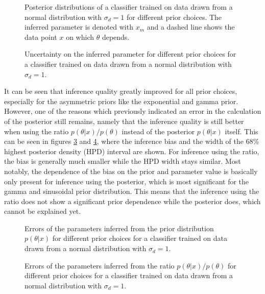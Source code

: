 \documentclass{article}
\begin{document}
\begin{figure}[ht]
    \centering
    
    \caption{Posterior distributions of a classifier trained on data drawn from a normal distribution with $\sigma_d=1$ for different prior choices. The inferred parameter is denoted with $x_m$ and a dashed line shows the data point $x$ on which $\theta$ depends.}
    \label{fig:prior_per_parameter_correct_1e0}
\end{figure}
\begin{figure}[ht]
    \centering
    
    \caption{Uncertainty on the inferred parameter for different prior choices for a classifier trained on data drawn from a normal distribution with $\sigma_d=1$.}
    \label{fig:errorbars_correct_1e0}
\end{figure}

\FloatBarrier

It can be seen that inference quality greatly improved for all prior choices, especially for the asymmetric priors like the exponential and gamma prior.
However, one of the reasons which previously indicated an error in the calculation of the posterior still remains,
namely that the inference quality is still better when using the ratio $p(\theta|x)/p(\theta)$ instead of the posterior $p(\theta|x)$ itself.
This can be seen in figures \ref{fig:correct_error_and_hpd_width_std1e0} and \ref{fig:correct_error_and_hpd_width_ratios_std1e0},
where the inference bias and the width of the 68\% highest posterior density (HPD) interval are shown.
For inference using the ratio, the bias is generally much smaller while the HPD width stays similar.
Most notably, the dependence of the bias on the prior and parameter value is basically only present for inference using the posterior, which is most significant for the gamma and sinusoidal prior distribution.
This means that the inference using the ratio does not show a significant prior dependence while the posterior does, which cannot be explained yet.

\begin{figure}[ht]
    \centering
    
    \caption{Errors of the parameters inferred from the prior distribution $p(\theta|x)$ for different prior choices for a classifier trained on data drawn from a normal distribution with $\sigma_d=1$.}
    \label{fig:correct_error_and_hpd_width_std1e0}
\end{figure}
\begin{figure}[ht]
    \centering
    
    \caption{Errors of the parameters inferred from the ratio $p(\theta|x)/p(\theta)$ for different prior choices for a classifier trained on data drawn from a normal distribution with $\sigma_d=1$.}
    \label{fig:correct_error_and_hpd_width_ratios_std1e0}
\end{figure}
\end{document}

